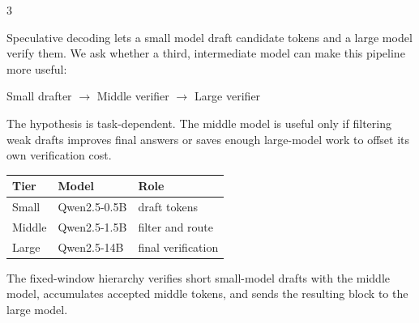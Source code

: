 \documentclass[landscape]{article}
\newcommand{\blocktitle}[1]{\vspace{0.22in}\noindent{\color{accent}\Huge\bfseries #1}\par\vspace{0.10in}}
\begin{document}
\begin{multicols}{3}

\blocktitle{Question}

Speculative decoding lets a small model draft candidate tokens and a large model verify them. We ask whether a third, intermediate model can make this pipeline more useful:

\vspace{0.08in}
\begin{center}
{\LARGE Small drafter $\rightarrow$ Middle verifier $\rightarrow$ Large verifier}
\end{center}

The hypothesis is task-dependent. The middle model is useful only if filtering weak drafts improves final answers or saves enough large-model work to offset its own verification cost.

\begin{center}
\begin{tabular}{lll}
\toprule
Tier & Model & Role \\
\midrule
Small & Qwen2.5-0.5B & draft tokens \\
Middle & Qwen2.5-1.5B & filter and route \\
Large & Qwen2.5-14B & final verification \\
\bottomrule
\end{tabular}
\end{center}

\blocktitle{Method}

The fixed-window hierarchy verifies short small-model drafts with the middle model, accumulates accepted middle tokens, and sends the resulting block to the large model.

\begin{center}
\end{center}


\end{multicols}
\end{document}
